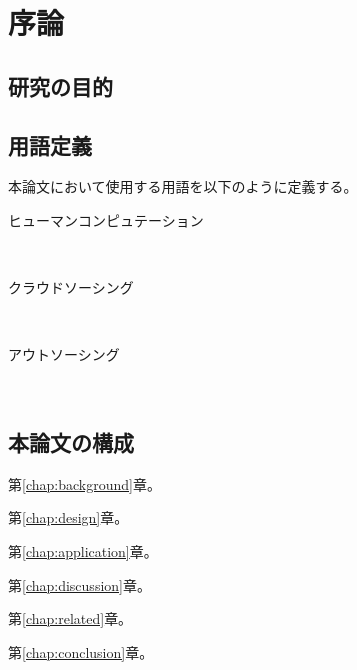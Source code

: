 \chapter{序論}
\label{chap:introduction}

\section{研究の目的}

\section{用語定義}

本論文において使用する用語を以下のように定義する。

\begin{description}
  \item [ヒューマンコンピュテーション] \mbox{}\\
  \item [クラウドソーシング] \mbox{}\\
  \item [アウトソーシング] \mbox{}\\

\end{description}

\section{本論文の構成}


第\ref{chap:background}章。

第\ref{chap:design}章。

第\ref{chap:application}章。

第\ref{chap:discussion}章。

第\ref{chap:related}章。

第\ref{chap:conclusion}章。

